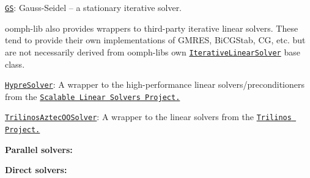 \begin{DoxyItemize}
\begin{DoxyItemize}
\begin{DoxyItemize}
\begin{DoxyItemize}
\item \href{../../the_data_structure/html/classoomph_1_1GS.html}{\tt {\ttfamily GS}}\+: Gauss-\/\+Seidel -- a stationary iterative solver. ~\newline
~\newline

\end{DoxyItemize}
\item {\ttfamily oomph-\/lib} also provides wrappers to third-\/party iterative linear solvers. These tend to provide their own implementations of {\ttfamily G\+M\+R\+ES}, {\ttfamily Bi\+C\+G\+Stab}, {\ttfamily CG}, etc. but are not necessarily derived from {\ttfamily oomph-\/lib\textquotesingle{}s} own \href{../../the_data_structure/html/classoomph_1_1IterativeLinearSolver.html}{\tt {\ttfamily Iterative\+Linear\+Solver}} base class. ~\newline
~\newline

\begin{DoxyItemize}
\item \href{../../the_data_structure/html/classoomph_1_1HypreSolver.html}{\tt {\ttfamily Hypre\+Solver}}\+: A wrapper to the high-\/performance linear solvers/preconditioners from the \href{https://computation.llnl.gov/casc/linear_solvers/sls_hypre.html}{\tt Scalable Linear Solvers Project.} ~\newline
~\newline

\item \href{../../the_data_structure/html/classoomph_1_1TrilinosAztecOOSolver.html}{\tt {\ttfamily Trilinos\+Aztec\+O\+O\+Solver}}\+: A wrapper to the linear solvers from the \href{http://trilinos.sandia.gov/}{\tt Trilinos Project.}~\newline
~\newline

\end{DoxyItemize}
\end{DoxyItemize}
\end{DoxyItemize}
\item {\bfseries Parallel solvers\+:} ~\newline
~\newline

\begin{DoxyItemize}
\item {\bfseries Direct solvers\+:} ~\newline
~\newline


\end{DoxyItemize}
\end{DoxyItemize}
